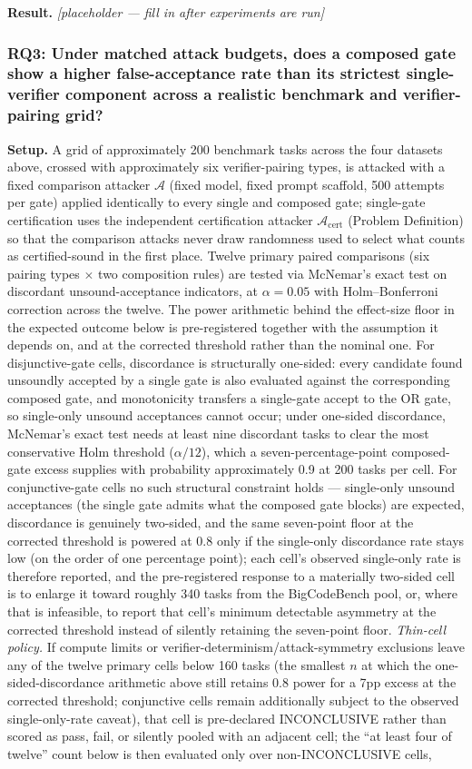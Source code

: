 \documentclass[11pt]{article}
\newcommand{\ph}{\textit{[placeholder --- fill in after experiments are run]}}
\begin{document}
\textbf{Result.} \ph

\subsubsection{RQ3: Under matched attack budgets, does a composed gate show a higher false-acceptance rate than its strictest single-verifier component across a realistic benchmark and verifier-pairing grid?}
\textbf{Setup.} A grid of approximately 200 benchmark tasks across the four datasets above, crossed with approximately six verifier-pairing types, is attacked with a fixed comparison attacker $\mathcal{A}$ (fixed model, fixed prompt scaffold, 500 attempts per gate) applied identically to every single and composed gate; single-gate certification uses the independent certification attacker $\mathcal{A}_{\text{cert}}$ (Problem Definition) so that the comparison attacks never draw randomness used to select what counts as certified-sound in the first place. Twelve primary paired comparisons (six pairing types $\times$ two composition rules) are tested via McNemar's exact test on discordant unsound-acceptance indicators, at $\alpha = 0.05$ with Holm--Bonferroni correction across the twelve. The power arithmetic behind the effect-size floor in the expected outcome below is pre-registered together with the assumption it depends on, and at the corrected threshold rather than the nominal one. For disjunctive-gate cells, discordance is structurally one-sided: every candidate found unsoundly accepted by a single gate is also evaluated against the corresponding composed gate, and monotonicity transfers a single-gate accept to the OR gate, so single-only unsound acceptances cannot occur; under one-sided discordance, McNemar's exact test needs at least nine discordant tasks to clear the most conservative Holm threshold ($\alpha/12$), which a seven-percentage-point composed-gate excess supplies with probability approximately 0.9 at 200 tasks per cell. For conjunctive-gate cells no such structural constraint holds --- single-only unsound acceptances (the single gate admits what the composed gate blocks) are expected, discordance is genuinely two-sided, and the same seven-point floor at the corrected threshold is powered at 0.8 only if the single-only discordance rate stays low (on the order of one percentage point); each cell's observed single-only rate is therefore reported, and the pre-registered response to a materially two-sided cell is to enlarge it toward roughly 340 tasks from the BigCodeBench pool, or, where that is infeasible, to report that cell's minimum detectable asymmetry at the corrected threshold instead of silently retaining the seven-point floor. \emph{Thin-cell policy.} If compute limits or verifier-determinism/attack-symmetry exclusions leave any of the twelve primary cells below 160 tasks (the smallest $n$ at which the one-sided-discordance arithmetic above still retains 0.8 power for a 7pp excess at the corrected threshold; conjunctive cells remain additionally subject to the observed single-only-rate caveat), that cell is pre-declared INCONCLUSIVE rather than scored as pass, fail, or silently pooled with an adjacent cell; the ``at least four of twelve'' count below is then evaluated only over non-INCONCLUSIVE cells, 
\end{document}
